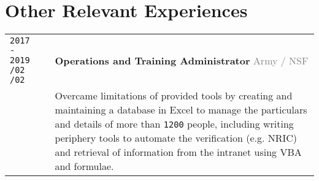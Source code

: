 \documentclass[11pt]{article}
\newcommand{\monoSp}[1]{{\usefont{T1}{rbtm}{m}{n} #1}}
\newcommand{\urllinkout}[2]{\href{#1}{\textcolor{text_link}{\small \texttt{#2}}}}
\newcommand{\code}[1]{\monoSp{#1}}
\newcommand{\nummer}[1]{\texttt{\large #1}}
\begin{document}
\section{\textcolor{section_3}{Other Relevant Experiences}}
\vspace{-\baselineskip}
{
	\renewcommand{\arraystretch}{2}
	\renewcommand{\cellalign}{lt}
	\begin{tabularx}{\textwidth}{@{}l p{0.20cm} X @{}}
		\makecell{\texttt{\large 2017 - 2019} \vspace{-1mm} \\ \texttt{\footnotesize /02} \hspace{1.5em} \texttt{\footnotesize /02}} & & \textbf{Operations and Training Administrator} \hfill \textcolor{gray}{Army / NSF} \\[-1em]
		& & {\small Overcame limitations of provided tools by creating and maintaining a database in Excel to manage the particulars and details of more than \nummer{1200} people, including writing periphery tools to automate the verification {\footnotesize(e.g. NRIC)} and retrieval of information from the intranet using \code{VBA} and formulae. }\\

\end{tabularx}}
\end{document}
